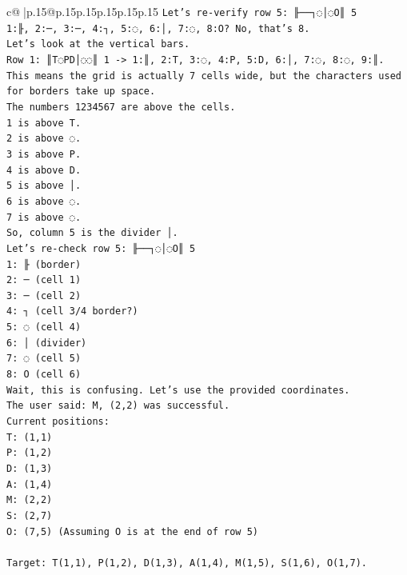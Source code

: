 \documentclass{article}
\begin{document}
{\begin{supertabular}{c@{$\;$}|p{.15\linewidth}@{}p{.15\linewidth}p{.15\linewidth}p{.15\linewidth}p{.15\linewidth}p{.15\linewidth}}
{{{\texttt{Let's re{-}verify row 5: ╟──┐◌│◌O║ 5} \\
\texttt{1:╟, 2:─, 3:─, 4:┐, 5:◌, 6:│, 7:◌, 8:O? No, that's 8.} \\
\texttt{Let's look at the vertical bars.} \\
\texttt{Row 1: ║T◌PD│◌◌║ 1 {-}> 1:║, 2:T, 3:◌, 4:P, 5:D, 6:│, 7:◌, 8:◌, 9:║.} \\
\texttt{This means the grid is actually 7 cells wide, but the characters used for borders take up space.} \\
\texttt{The numbers 1234567 are above the cells.} \\
\texttt{1 is above T.} \\
\texttt{2 is above ◌.} \\
\texttt{3 is above P.} \\
\texttt{4 is above D.} \\
\texttt{5 is above │.} \\
\texttt{6 is above ◌.} \\
\texttt{7 is above ◌.} \\
\texttt{So, column 5 is the divider │.} \\
\texttt{Let's re{-}check row 5: ╟──┐◌│◌O║ 5} \\
\texttt{1: ╟ (border)} \\
\texttt{2: ─ (cell 1)} \\
\texttt{3: ─ (cell 2)} \\
\texttt{4: ┐ (cell 3/4 border?)} \\
\texttt{5: ◌ (cell 4)} \\
\texttt{6: │ (divider)} \\
\texttt{7: ◌ (cell 5)} \\
\texttt{8: O (cell 6)} \\
\texttt{Wait, this is confusing. Let's use the provided coordinates.} \\
\texttt{The user said: M, (2,2) was successful.} \\
\texttt{Current positions:} \\
\texttt{T: (1,1)} \\
\texttt{P: (1,2)} \\
\texttt{D: (1,3)} \\
\texttt{A: (1,4)} \\
\texttt{M: (2,2)} \\
\texttt{S: (2,7)} \\
\texttt{O: (7,5) (Assuming O is at the end of row 5)} \\
\\ 
\texttt{Target: T(1,1), P(1,2), D(1,3), A(1,4), M(1,5), S(1,6), O(1,7).} \\
}}}
\end{supertabular}}
\end{document}
